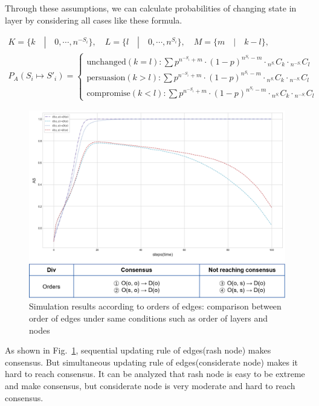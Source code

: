 Through these assumptions, we can calculate probabilities of changing state in layer by considering all cases like these formula.  

\begin{equation}
\begin{array}{l}
K = \{ k \quad|\quad 0, \cdots ,{n^{ - {S_i}}}\}, \quad L = \{l \quad|\quad 0, \cdots ,{n^{{S_i}}}\},
\quad M = \{m \quad|\quad k-l\}, \\
{P_A}({S_i} \mapsto {{S'}_i}) = \begin{cases}
\mbox{unchanged}(k = l):\sum {{p^{{n^{ - {S_i}}}+m}} \cdot {{(1 - p)}^{{n^{{S_i}}}-m}} \cdot {}_{{n^{{S_{^i}}}}}{C_k} \cdot {}_{{n^{ - {S_{^i}}}}}{C_l}} \\
\mbox{persuasion}(k > l):\sum {{p^{{n^{ - {S_i}}}+m}} \cdot {{(1 - p)}^{{n^{{S_i}}}-m}} \cdot {}_{{n^{{S_{^i}}}}}{C_k} \cdot {}_{{n^{ - {S_{^i}}}}}{C_l}} \\
\mbox{compromise}(k < l):\sum {{p^{{n^{ - {S_i}}}+m}} \cdot {{(1 - p)}^{{n^{{S_i}}}-m}} \cdot {}_{{n^{{S_{^i}}}}}{C_k} \cdot {}_{{n^{ - {S_{^i}}}}}{C_l}} 
\end{cases}
\end{array}
\end{equation}

\begin{figure}[!htb]
	\centering
	\includegraphics[width=\hsize]{figure/edgeorder.png}
	\caption{Simulation results according to orders of edges: comparison between order of edges under same conditions such as order of layers and nodes}
	\label{edgeorder}
\end{figure}
As shown in Fig.~\ref{edgeorder}, sequential updating rule of edges(rash node) makes consensus. But simultaneous updating rule of edges(considerate node) makes it hard to reach consensus. It can be analyzed that rash node is easy to be extreme and make consensus, but considerate node is very moderate and hard to reach consensus. 

